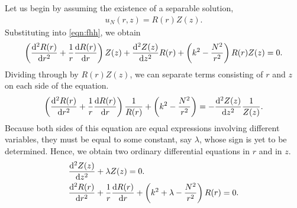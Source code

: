 Let us begin by assuming the existence of a separable solution,
\begin{align}
	u_N(r,z) = R(r)Z(z).
\end{align}
Substituting into \eqref{eqn:fhh}, we obtain
\begin{align}
	\left( \frac{\mathrm{d}^2 R(r)}{\mathrm{d} r^2} + \frac{1}{r} \frac{\mathrm{d} R(r)}{\mathrm{d} r} \right) Z(z) + \frac{\mathrm{d}^2 Z(z)}{\mathrm{d} z^2} R(r) + \left( k^2 - \frac{N^2}{r^2} \right) R(r) Z(z) = 0.
\end{align}
Dividing through by $R(r)Z(z)$, we can separate terms consisting of $r$ and $z$ on each side of the equation.
\begin{align}
	\left( \frac{\mathrm{d}^2 R(r)}{\mathrm{d} r^2} + \frac{1}{r} \frac{\mathrm{d} R(r)}{\mathrm{d} r} \right)\frac{1}{R(r)} + \left( k^2 - \frac{N^2}{r^2} \right) = - \frac{\mathrm{d}^2 Z(z)}{\mathrm{d} z^2} \frac{1}{Z(z)}.
\end{align}
Because both sides of this equation are equal expressions involving different variables, they must be equal to some constant, say $\lambda$, whose sign is yet to be determined.
Hence, we obtain two ordinary differential equations in $r$ and in $z$.
\begin{align}
	&\frac{\mathrm{d}^2 Z(z)}{\mathrm{d} z^2} + \lambda Z(z) = 0. \label{eqn:Z}\\
	&\frac{\mathrm{d}^2 R(r)}{\mathrm{d} r^2} + \frac{1}{r} \frac{\mathrm{d} R(r)}{\mathrm{d} r} + \left( k^2 + \lambda - \frac{N^2}{r^2} \right) R(r) = 0. \label{eqn:R}
\end{align}


